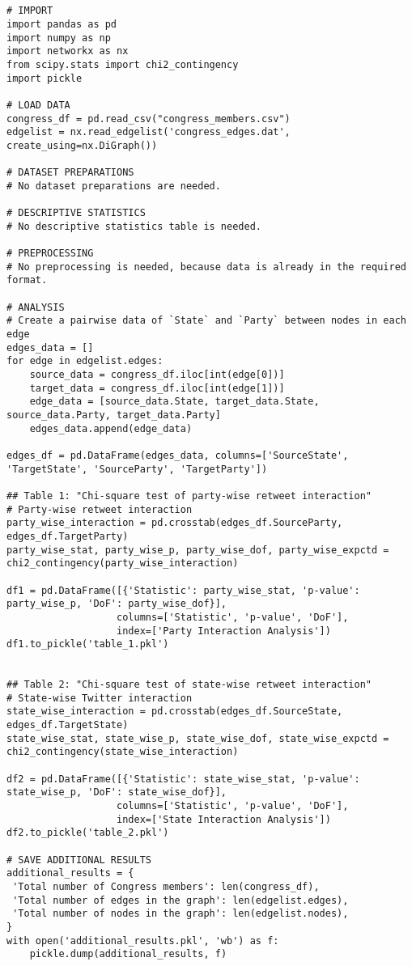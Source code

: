 \documentclass[11pt]{article}
\begin{document}
\begin{verbatim}


# IMPORT
import pandas as pd
import numpy as np
import networkx as nx
from scipy.stats import chi2_contingency
import pickle

# LOAD DATA
congress_df = pd.read_csv("congress_members.csv")
edgelist = nx.read_edgelist('congress_edges.dat', create_using=nx.DiGraph())

# DATASET PREPARATIONS
# No dataset preparations are needed.

# DESCRIPTIVE STATISTICS
# No descriptive statistics table is needed.

# PREPROCESSING 
# No preprocessing is needed, because data is already in the required format.

# ANALYSIS
# Create a pairwise data of `State` and `Party` between nodes in each edge
edges_data = []
for edge in edgelist.edges:
    source_data = congress_df.iloc[int(edge[0])]
    target_data = congress_df.iloc[int(edge[1])]
    edge_data = [source_data.State, target_data.State, source_data.Party, target_data.Party]
    edges_data.append(edge_data)

edges_df = pd.DataFrame(edges_data, columns=['SourceState', 'TargetState', 'SourceParty', 'TargetParty'])

## Table 1: "Chi-square test of party-wise retweet interaction"
# Party-wise retweet interaction
party_wise_interaction = pd.crosstab(edges_df.SourceParty, edges_df.TargetParty)
party_wise_stat, party_wise_p, party_wise_dof, party_wise_expctd = chi2_contingency(party_wise_interaction)

df1 = pd.DataFrame([{'Statistic': party_wise_stat, 'p-value': party_wise_p, 'DoF': party_wise_dof}],
                   columns=['Statistic', 'p-value', 'DoF'], 
                   index=['Party Interaction Analysis'])
df1.to_pickle('table_1.pkl')


## Table 2: "Chi-square test of state-wise retweet interaction"
# State-wise Twitter interaction
state_wise_interaction = pd.crosstab(edges_df.SourceState, edges_df.TargetState)
state_wise_stat, state_wise_p, state_wise_dof, state_wise_expctd = chi2_contingency(state_wise_interaction)

df2 = pd.DataFrame([{'Statistic': state_wise_stat, 'p-value': state_wise_p, 'DoF': state_wise_dof}],
                   columns=['Statistic', 'p-value', 'DoF'], 
                   index=['State Interaction Analysis'])
df2.to_pickle('table_2.pkl')

# SAVE ADDITIONAL RESULTS
additional_results = {
 'Total number of Congress members': len(congress_df), 
 'Total number of edges in the graph': len(edgelist.edges),
 'Total number of nodes in the graph': len(edgelist.nodes),
}
with open('additional_results.pkl', 'wb') as f:
    pickle.dump(additional_results, f)

\end{verbatim}
\end{document}
